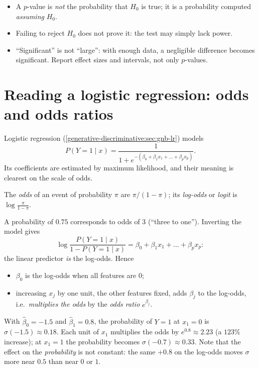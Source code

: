 \begin{notechapter}
\begin{pitfall}
\begin{itemize}[nosep]
  \item A $p$-value is \emph{not} the probability that $H_0$ is true; it is a
        probability computed \emph{assuming} $H_0$.
  \item Failing to reject $H_0$ does not prove it: the test may simply lack
        power.
  \item ``Significant'' is not ``large'': with enough data, a negligible
        difference becomes significant. Report effect sizes and intervals,
        not only $p$-values.
\end{itemize}
\end{pitfall}

\section{Reading a logistic regression: odds and odds ratios}\label{lln-clt-inference:sec:odds}

Logistic regression (\cref{generative-discriminative:sec:gnb-lr}) models
\[
  P(Y = 1\mid x) = \frac{1}{1 + e^{-(\beta_0 + \beta_1x_1 + \dots + \beta_px_p)}} .
\]
Its coefficients are estimated by maximum likelihood, and their meaning is
clearest on the scale of odds.

\begin{definition}
The \emph{odds} of an event of probability $\pi$ are $\pi/(1-\pi)$; its
\emph{log-odds} or \emph{logit} is $\log\frac{\pi}{1-\pi}$.
\end{definition}

A probability of $0.75$ corresponds to odds of $3$ (``three to one''). Inverting
the model gives
\[
  \log\frac{P(Y=1\mid x)}{1 - P(Y=1\mid x)} = \beta_0 + \beta_1x_1 + \dots + \beta_px_p :
\]
the linear predictor \emph{is} the log-odds. Hence
\begin{itemize}
  \item $\beta_0$ is the log-odds when all features are $0$;
  \item increasing $x_j$ by one unit, the other features fixed, adds $\beta_j$ to
        the log-odds, i.e.\ \emph{multiplies the odds} by the \emph{odds ratio}
        $e^{\beta_j}$.
\end{itemize}

\begin{example}\label{lln-clt-inference:ex:odds}
With $\hat\beta_0 = -1.5$ and $\hat\beta_1 = 0.8$, the probability of $Y = 1$ at
$x_1 = 0$ is $\sigma(-1.5)\approx0.18$. Each unit of $x_1$ multiplies the odds by
$e^{0.8}\approx2.23$ (a $123\%$ increase); at $x_1 = 1$ the probability becomes
$\sigma(-0.7)\approx0.33$. Note that the effect on the \emph{probability} is not
constant: the same $+0.8$ on the log-odds moves $\sigma$ more near $0.5$ than near
$0$ or $1$.


\end{example}
\end{notechapter}
